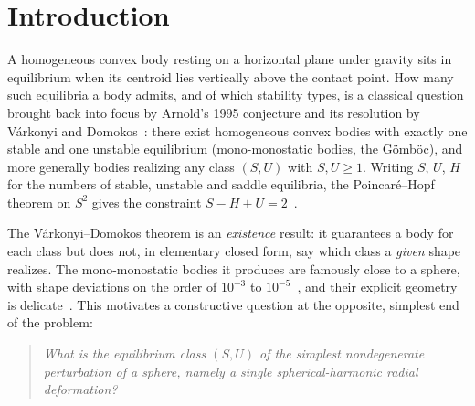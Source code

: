 \documentclass[11pt,a4paper]{article}
\theoremstyle{definition}
\begin{document}
\section{Introduction}

A homogeneous convex body resting on a horizontal plane under gravity sits in equilibrium when its centroid
lies vertically above the contact point. How many such equilibria a body admits, and of which stability types,
is a classical question brought back into focus by Arnold's 1995 conjecture and its resolution by V\'arkonyi
and
Domokos~\cite{varkonyi2006a,varkonyi2006b}: there exist homogeneous convex bodies with exactly one stable and
one unstable equilibrium (mono-monostatic bodies, the G\"omb\"oc), and more generally bodies realizing any
class $(S,U)$ with $S,U\ge1$. Writing $S$, $U$, $H$ for the numbers of stable, unstable and saddle equilibria,
the Poincar\'e--Hopf theorem on $S^2$ gives the constraint $S-H+U=2$~\cite{varkonyi2006b}.

The V\'arkonyi--Domokos theorem is an \emph{existence} result: it guarantees a body for each class but does
not, in elementary closed form, say which class a \emph{given} shape realizes. The mono-monostatic bodies it
produces are famously close to a sphere, with shape deviations on the order of $10^{-3}$ to
$10^{-5}$~\cite{varkonyi2006a}, and their explicit geometry is delicate~\cite{sloan2023}. This motivates a
constructive question at the opposite, simplest end of the problem:

\begin{quote}
\emph{What is the equilibrium class $(S,U)$ of the simplest nondegenerate perturbation of a sphere, namely a
single spherical-harmonic radial deformation?}
\end{quote}
\end{document}
